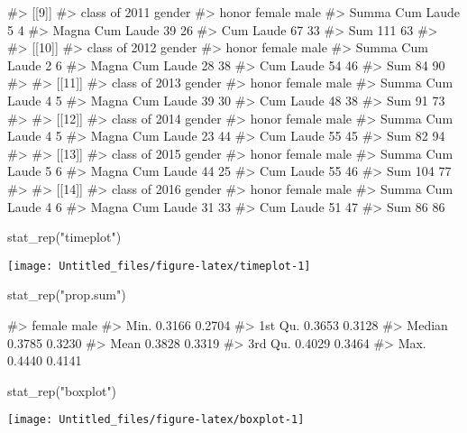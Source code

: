 \begin{Schunk}
\begin{Soutput}
#> [[9]]
#>                  class of 2011 gender
#> honor             female male
#>   Summa Cum Laude      5    4
#>   Magna Cum Laude     39   26
#>   Cum Laude           67   33
#>   Sum                111   63
#> 
#> [[10]]
#>                  class of 2012 gender
#> honor             female male
#>   Summa Cum Laude      2    6
#>   Magna Cum Laude     28   38
#>   Cum Laude           54   46
#>   Sum                 84   90
#> 
#> [[11]]
#>                  class of 2013 gender
#> honor             female male
#>   Summa Cum Laude      4    5
#>   Magna Cum Laude     39   30
#>   Cum Laude           48   38
#>   Sum                 91   73
#> 
#> [[12]]
#>                  class of 2014 gender
#> honor             female male
#>   Summa Cum Laude      4    5
#>   Magna Cum Laude     23   44
#>   Cum Laude           55   45
#>   Sum                 82   94
#> 
#> [[13]]
#>                  class of 2015 gender
#> honor             female male
#>   Summa Cum Laude      5    6
#>   Magna Cum Laude     44   25
#>   Cum Laude           55   46
#>   Sum                104   77
#> 
#> [[14]]
#>                  class of 2016 gender
#> honor             female male
#>   Summa Cum Laude      4    6
#>   Magna Cum Laude     31   33
#>   Cum Laude           51   47
#>   Sum                 86   86
\end{Soutput}
\end{Schunk}

\begin{Schunk}
\begin{Sinput}
stat_rep("timeplot")
\end{Sinput}

\texttt{[image: Untitled\_files/figure-latex/timeplot-1]} \end{Schunk}

\begin{Schunk}
\begin{Sinput}
stat_rep("prop.sum")
\end{Sinput}
\begin{Soutput}
#>         female   male
#> Min.    0.3166 0.2704
#> 1st Qu. 0.3653 0.3128
#> Median  0.3785 0.3230
#> Mean    0.3828 0.3319
#> 3rd Qu. 0.4029 0.3464
#> Max.    0.4440 0.4141
\end{Soutput}
\end{Schunk}

\begin{Schunk}
\begin{Sinput}
stat_rep("boxplot")
\end{Sinput}

\texttt{[image: Untitled\_files/figure-latex/boxplot-1]} \end{Schunk}

